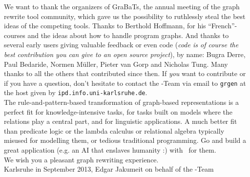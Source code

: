 
We want to thank the organizers of GraBaTs\cite{grabats}, the annual meeting of the graph rewrite tool community,
which gave us the possibility to ruthlessly steal the best ideas of the competing tools.
Thanks to Berthold Hoffmann, for his ``French''-courses and the ideas about how to handle program graphs.
And thanks to several early users giving valuable feedback or even code (\emph{code is of course the best contribution you can give to an open source project}), by name:
Bugra Derre, Paul Bedaride, Normen Müller, Pieter van Gorp and Nicholas Tung.
Many thanks to all the others that contributed since then.
If \emph{you} want to contribute or if you have a question, don't hesitate to contact the \GrG-Team
via email to \texttt{grgen} at the host given by \texttt{ipd.info.uni-karlsruhe.de}.\\[2ex]

The rule-and-pattern-based transformation of graph-based representations is a perfect fit for know\-ledge-intensive tasks, for tasks built on models where the relations play a central part, and for linguistic applications.
A much better fit than predicate logic or the lambda calculus or relational algebra typically misused for modelling them, or tedious traditional programming.
Go and build a great application (e.g. an AI that enslaves humanity :) with \GrG\ for them.\\[2ex]

We wish you a pleasant graph rewriting experience.\\[2ex]

\noindent Karlsruhe in September 2013, Edgar Jakumeit on behalf of the \GrG-Team
